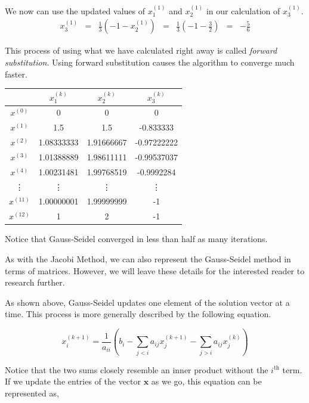 We now can use the updated values of $x^{(1)}_1$ and $x^{(1)}_2$ in our calculation of $x^{(1)}_3$.
$$
\begin{matrix}
x^{(1)}_3 & = & \frac{1}{3} ( -1 - x^{(1)}_2)       & = & \frac{1}{3} (-1 - \frac{3}{2})    & = & -\frac{5}{6}
\end{matrix}
$$

This process of using what we have calculated right away is called \emph{forward substitution}. Using forward substitution causes the algorithm to converge much faster.

\begin{center}
    \begin{tabular} {c | c c c}
        & $x^{(k)}_1$ & $x^{(k)}_2$ & $x^{(k)}_3$ \\
        \hline
          $x^{(0)}$ & 0 & 0 & 0 \\
          $x^{(1)}$ & 1.5 & 1.5 & -0.833333 \\
          $x^{(2)}$ & 1.08333333 & 1.91666667 & -0.97222222 \\
          $x^{(3)}$ & 1.01388889 & 1.98611111 & -0.99537037 \\
          $x^{(4)}$ & 1.00231481 & 1.99768519 & -0.9992284 \\
          \vdots    & \vdots    & \vdots     & \vdots     \\
          $x^{(11)}$ & 1.00000001 & 1.99999999 & -1 \\
          $x^{(12)}$ & 1 & 2 & -1 \\
        \end{tabular}
\end{center}
Notice that Gauss-Seidel converged in less than half as many iterations.

As with the Jacobi Method, we can also represent the Gauss-Seidel method in terms of matrices. However, we will leave these details for the interested reader to research further.

As shown above, Gauss-Seidel updates one element of the solution vector at a time. This process is more generally described by the following equation.

\begin{equation} \label{eq:gauss_seidel_full}
x^{(k+1)}_i = \frac{1}{a_{ii}} \left (b_i - \sum_{j < i}a_{ij}x^{(k+1)}_j - \sum_{j > i}a_{ij}x^{(k)}_j \right )
\end{equation}

Notice that the two sums closely resemble an inner product without the $i^{\text{th}}$ term. If we update the entries of the vector $\mathbf{x}$ as we go, this equation can be represented as,

